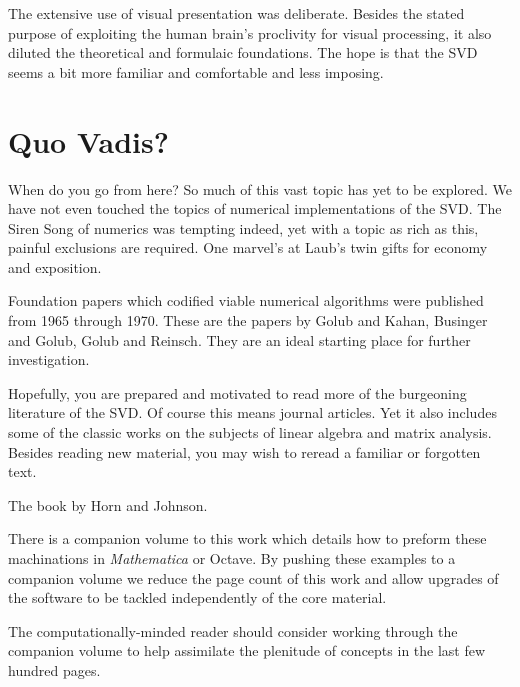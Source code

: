The extensive use of visual presentation was deliberate. Besides the stated purpose of exploiting the human brain's proclivity for visual processing, it also diluted the theoretical and formulaic foundations. The hope is that the SVD seems a bit more familiar and comfortable and less imposing.

\section{Quo Vadis?}
When do you go from here? So much of this vast topic has yet to be explored. We have not even touched the topics of numerical implementations of the SVD. The Siren Song of numerics was tempting indeed, yet with a topic as rich as this, painful exclusions are required. One marvel's at Laub's twin gifts for economy and exposition.

Foundation papers which codified viable numerical algorithms were published from 1965 through 1970. These are the papers by Golub and Kahan\cite{Golub1}, Businger and Golub\cite{Businger}, Golub and Reinsch.\cite{Golub2} They are an ideal starting place for further investigation.

Hopefully, you are prepared and motivated to read more of the burgeoning literature of the SVD. Of course this means journal articles. Yet it also includes some of the classic works on the subjects of linear algebra and matrix analysis. Besides reading new material, you may wish to reread a familiar or forgotten text.

The book by Horn and Johnson.\cite{HJ2}

There is a companion volume to this work which details how to preform these machinations in \emph{Mathematica} or Octave. By pushing these examples to a companion volume we reduce the page count of this work and allow upgrades of the software to be tackled independently of the core material.

The computationally-minded reader should consider working through the companion volume to help assimilate the plenitude of concepts in the last few hundred pages.


\endinput